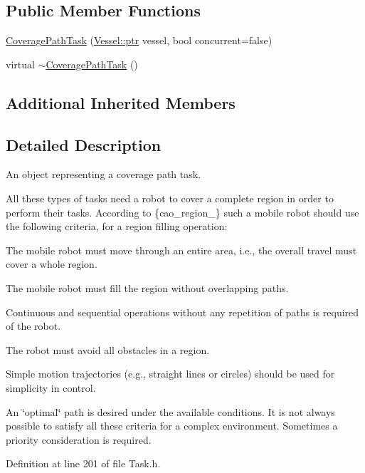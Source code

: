 \subsection*{Public Member Functions}
\begin{DoxyCompactItemize}
\item 
\hyperlink{classo_cpt_1_1_coverage_path_task_ad08940ffc37098818fc119d6ea2d53f2}{Coverage\+Path\+Task} (\hyperlink{classo_cpt_1_1i_vessel_a43711a596f3bdfd0ca732ed3901edc97}{Vessel\+::ptr} vessel, bool concurrent=false)
\item 
virtual \hyperlink{classo_cpt_1_1_coverage_path_task_a8773343bb232c3a22b8ec6acf483bee1}{$\sim$\+Coverage\+Path\+Task} ()
\end{DoxyCompactItemize}
\subsection*{Additional Inherited Members}


\subsection{Detailed Description}
An object representing a coverage path task. 

All these types of tasks need a robot to cover a complete region in order to perform their tasks. According to \{cao\+\_\+region\+\_\} such a mobile robot should use the following criteria, for a region filling operation\+:
\begin{DoxyEnumerate}
\item The mobile robot must move through an entire area, i.\+e., the overall travel must cover a whole region.
\item The mobile robot must fill the region without overlapping paths.
\item Continuous and sequential operations without any repetition of paths is required of the robot.
\item The robot must avoid all obstacles in a region.
\item Simple motion trajectories (e.\+g., straight lines or circles) should be used for simplicity in control.
\item An \char`\"{}optimal\char`\"{} path is desired under the available conditions. It is not always possible to satisfy all these criteria for a complex environment. Sometimes a priority consideration is required. 
\end{DoxyEnumerate}

Definition at line 201 of file Task.\+h.



